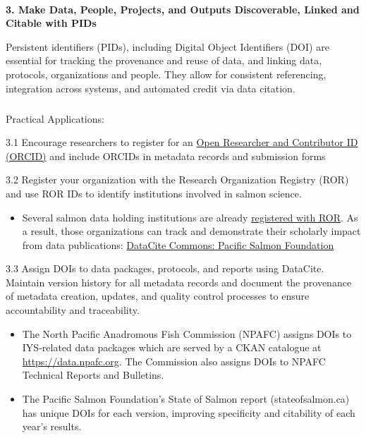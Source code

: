 \documentclass[
  letterpaper,
  DIV=11,
  numbers=noendperiod]{scrartcl}
\makeatletter
\let\oldparagraph\paragraph
\renewcommand{\paragraph}{
    \@ifstar
      \xxxParagraphStar
      \xxxParagraphNoStar
  }
\newcommand{\xxxParagraphStar}[1]{\oldparagraph*{#1}\mbox{}}
\newcommand{\xxxParagraphNoStar}[1]{\oldparagraph{#1}\mbox{}}
\let\oldsubparagraph\subparagraph
\renewcommand{\subparagraph}{
    \@ifstar
      \xxxSubParagraphStar
      \xxxSubParagraphNoStar
  }
\newcommand{\xxxSubParagraphStar}[1]{\oldsubparagraph*{#1}\mbox{}}
\newcommand{\xxxSubParagraphNoStar}[1]{\oldsubparagraph{#1}\mbox{}}
\providecommand{\tightlist}{%
  \setlength{\itemsep}{0pt}\setlength{\parskip}{0pt}}
\makeatother
\begin{document}
\paragraph{\texorpdfstring{\textbf{3. Make Data, People, Projects, and
Outputs Discoverable, Linked and Citable with
PIDs}}{3. Make Data, People, Projects, and Outputs Discoverable, Linked and Citable with PIDs}}\label{make-data-people-projects-and-outputs-discoverable-linked-and-citable-with-pids}

Persistent identifiers (PIDs), including Digital Object Identifiers
(DOI) are essential for tracking the provenance and reuse of data, and
linking data, protocols, organizations and people. They allow for
consistent referencing, integration across systems, and automated credit
via data citation.

\subparagraph{Practical Applications:}\label{practical-applications-2}

3.1 Encourage researchers to register for an
\href{https://orcid.org/}{Open Researcher and Contributor ID (ORCID)}
and include ORCIDs in metadata records and submission forms

3.2 Register your organization with the Research Organization Registry
(ROR) and use ROR IDs to identify institutions involved in salmon
science.

\begin{itemize}
\tightlist
\item
  Several salmon data holding institutions are already
  \href{https://ror.org/search?page=1&query=salmon}{registered with
  ROR}. As a result, those organizations can track and demonstrate their
  scholarly impact from data publications:
  \href{https://commons.datacite.org/ror.org/04901nj56}{DataCite
  Commons: Pacific Salmon Foundation}
\end{itemize}

3.3 Assign DOIs to data packages, protocols, and reports using DataCite.
Maintain version history for all metadata records and document the
provenance of metadata creation, updates, and quality control processes
to ensure accountability and traceability.

\begin{itemize}
\tightlist
\item
  The North Pacific Anadromous Fish Commission (NPAFC) assigns DOIs to
  IYS-related data packages which are served by a CKAN catalogue at
  \url{https://data.npafc.org}. The Commission also assigns DOIs to
  NPAFC Technical Reports and Bulletins.
\item
  The Pacific Salmon Foundation's State of Salmon report
  (stateofsalmon.ca) has unique DOIs for each version, improving
  specificity and citability of each year's results.
\end{itemize}
\end{document}
